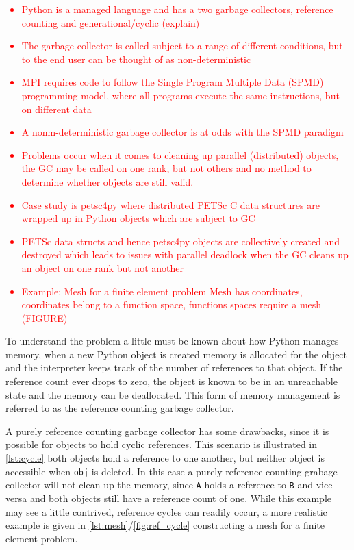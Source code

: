 \documentclass[10pt,journal,compsoc]{IEEEtran}
\newcommand{\jacknotes}[1]{\textcolor{red}{#1}}
\begin{document}
\jacknotes{
\begin{itemize}
	\item Python is a managed language and has a two garbage collectors, reference counting and generational/cyclic (explain)
	\item The garbage collector is called subject to a range of different conditions, but to the end user can be thought of as non-deterministic
	\item MPI requires code to follow the Single Program Multiple Data (SPMD) programming model, where all programs execute the same instructions, but on different data
	\item A nonm-deterministic garbage collector is at odds with the SPMD paradigm
	\item Problems occur when it comes to cleaning up parallel (distributed) objects, the GC may be called on one rank, but not others and no method to determine whether objects are still valid.
	\item Case study is petsc4py where distributed PETSc C data structures are wrapped up in Python objects which are subject to GC
	\item PETSc data structs and hence petsc4py objects are collectively created and destroyed which leads to issues with parallel deadlock when the GC cleans up an object on one rank but not another
	\item Example: Mesh for a finite element problem Mesh has coordinates, coordinates belong to a function space, functions spaces require a mesh (FIGURE) 
\end{itemize}
}

To understand the problem a little must be known about how Python manages memory, when a new Python object is created memory is allocated for the object and the interpreter keeps track of the number of references to that object.
If the reference count ever drops to zero, the object is known to be in an unreachable state and the memory can be deallocated.
This form of memory management is referred to as the reference counting garbage collector.

A purely reference counting garbage collector has some drawbacks, since it is possible for objects to hold cyclic references.
This scenario is illustrated in \cref{lst:cycle} both objects hold a reference to one another, but neither object is accessible when \verb`obj` is deleted.
In this case a purely reference counting grabage collector will not clean up the memory, since \verb`A` holds a reference to \verb`B` and vice versa and both objects still have a reference count of one.
While this example may see a little contrived, reference cycles can readily occur, a more realistic example is given in \cref{lst:mesh}/\cref{fig:ref_cycle} constructing a mesh for a finite element problem.
\end{document}
